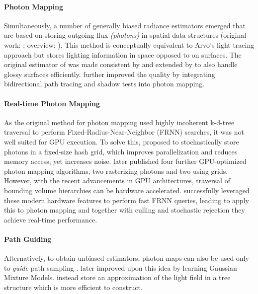 \paragraph{Photon Mapping}
Simultaneously, a number of generally biased radiance estimators emerged that are based on storing outgoing flux \emph{(photons)} in spatial data structures (original work: \cite{jensen1996}; overview: \cite{kang2016}).
This method is conceptually equivalent to Arvo's light tracing approach  but stores lighting information in space opposed to on surfaces.
The original estimator of \textcite{jensen1996} was made consistent by \textcite{hachisuka2008,knaus2011} and extended by \textcite{hachisuka2009a} to also handle glossy surfaces efficiently.
\textcite{georgiev2012} further improved the quality by integrating bidirectional path tracing and shadow tests into photon mapping.

\paragraph{Real-time Photon Mapping}
As the original method for photon mapping  used highly incoherent k-d-tree traversal to perform Fixed-Radius-Near-Neighbor (FRNN) searches, it was not well suited for GPU execution.
To solve this, \textcite{hachisuka2010} proposed to stochastically store photons in a fixed-size hash grid, which improves parallelization and reduces memory access, yet increases noise.
\textcite{mara2013} later published four further GPU-optimized photon mapping algorithms, two rasterizing photons and two using grids.
However, with the recent advancements in GPU architectures, traversal of bounding volume hierarchies can be hardware accelerated.
\textcite{evangelou2021} successfully leveraged these modern hardware features to perform fast FRNN queries, leading \textcite{kern2023} to apply this to photon mapping and together with culling and stochastic rejection they achieve real-time performance.

\paragraph{Path Guiding}
Alternatively, to obtain unbiased estimators, photon maps  can also be used only to \emph{guide} path sampling .
\textcite{vorba2014} later improved upon this idea by learning Gaussian Mixture Models.
\textcite{muller2017} instead store an approximation of the light field in a tree structure which is more efficient to construct.

